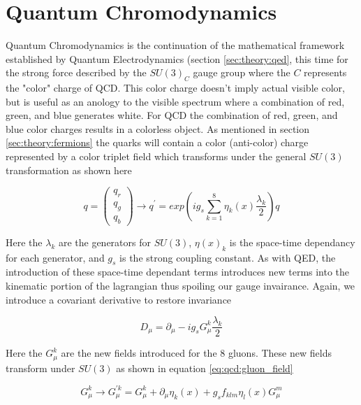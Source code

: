 \section{Quantum Chromodynamics} \label{sec:theory:qcd}

Quantum Chromodynamics is the continuation of the mathematical framework
established by Quantum Electrodynamics (section \ref{sec:theory:qed}, this time
for the strong force described by the $SU(3)_C$ gauge group where the $C$
represents the "color" charge of QCD.  This color charge doesn't imply actual
visible color, but is useful as an anology to the visible spectrum where a
combination of red, green, and blue generates white.  For QCD the combination of
red, green, and blue color charges results in a colorless object.  As mentioned
in section \ref{sec:theory:fermions} the quarks will contain a color
(anti-color) charge represented by a color triplet field which transforms under
the general $SU(3)$ transformation as shown here

\begin{equation}
q = \left( \begin{matrix} q_{r} \\ q_{g} \\ q_{b} \end{matrix} \right)
\rightarrow q^{'} = exp \left( ig_{s} \sum_{k=1}^{8} \eta_{k}(x)
\frac{\lambda_k}{2} \right) q
\end{equation}

Here the $\lambda_{k}$ are the generators for $SU(3)$, $\eta(x)_{k}$ is the
space-time dependancy for each generator, and  $g_s$ is the strong coupling constant.
As with QED, the introduction of these space-time dependant terms introduces new
terms into the kinematic portion of the lagrangian thus spoiling our gauge
invairance.  Again, we introduce a covariant derivative to restore invariance

\begin{equation}
D_{\mu} = \partial_{\mu} - ig_{s}G_{\mu}^{k}\frac{\lambda_{k}}{2}
\end{equation}

Here the $G_{\mu}^{k}$ are the new fields introduced for the 8 gluons.  These
new fields transform under $SU(3)$ as shown in equation
\ref{eq:qcd:gluon_field}

\begin{equation} \label{eq:qcd:gluon_field}
G_{\mu}^{k} \rightarrow G_{\mu}^{'k} = G_{\mu}^{k} + \partial_{\mu}\eta_{k}(x) +
g_{s}f_{klm}\eta_{l}(x)G_{\mu}^{m}
\end{equation}

